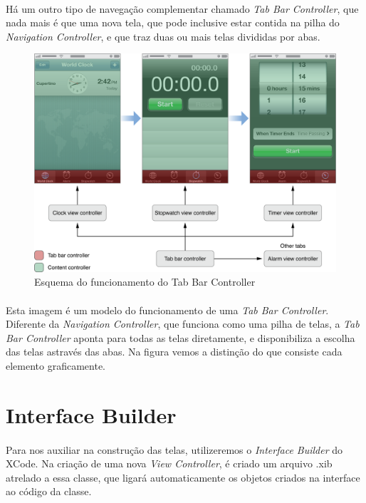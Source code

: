\documentclass[a4paper,12pt,brazil,doubleside]{book}
\begin{document}
\begin{singlespace}
\paragraph{}Há um outro tipo de navegação complementar chamado \emph{Tab Bar Controller}, que nada mais é que uma nova tela, que pode inclusive estar contida na pilha do \emph{Navigation Controller}, e que traz duas ou mais telas divididas por abas.

\bigskip
\bigskip

\begin{figure}[h]
  \centering
  \includegraphics[totalheight=0.4\textheight]{figuras/apple_tabbar_interface.png}
  \caption{Esquema do funcionamento do Tab Bar Controller}
  \label{fig:a}
\end{figure}

\paragraph{}Esta imagem é um modelo do funcionamento de uma \emph{Tab Bar Controller}. Diferente da \emph{Navigation Controller}, que funciona como uma pilha de telas, a \emph{Tab Bar Controller} aponta para todas as telas diretamente, e disponibiliza a escolha das telas astravés das abas. Na figura vemos a distinção do que consiste cada elemento graficamente.

\bigskip
\bigskip


\section{Interface Builder}

\paragraph{}Para nos auxiliar na construção das telas, utilizeremos o \emph{Interface Builder} do XCode. Na criação de uma nova \emph{View Controller}, é criado um arquivo .xib atrelado a essa classe, que ligará automaticamente os objetos criados na interface ao código da classe.

\end{singlespace}
\end{document}
